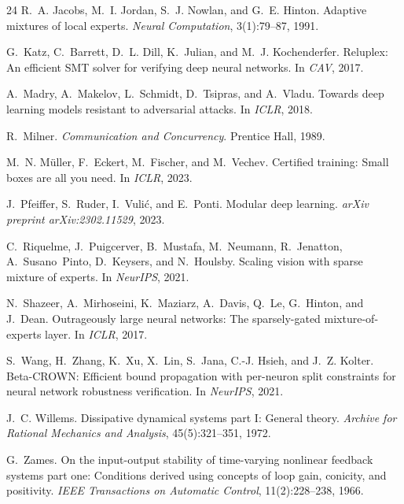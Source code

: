 \documentclass{article}
\theoremstyle{plain}
\theoremstyle{remark}
\begin{document}
\begin{thebibliography}{24}
R.~A. Jacobs, M.~I. Jordan, S.~J. Nowlan, and G.~E. Hinton.
\newblock Adaptive mixtures of local experts.
\newblock \emph{Neural Computation}, 3(1):79--87, 1991.

G.~Katz, C.~Barrett, D.~L. Dill, K.~Julian, and M.~J. Kochenderfer.
\newblock Reluplex: An efficient SMT solver for verifying deep neural networks.
\newblock In \emph{CAV}, 2017.

A.~Madry, A.~Makelov, L.~Schmidt, D.~Tsipras, and A.~Vladu.
\newblock Towards deep learning models resistant to adversarial attacks.
\newblock In \emph{ICLR}, 2018.

R.~Milner.
\newblock \emph{Communication and Concurrency}.
\newblock Prentice Hall, 1989.

M.~N. M{\"u}ller, F.~Eckert, M.~Fischer, and M.~Vechev.
\newblock Certified training: Small boxes are all you need.
\newblock In \emph{ICLR}, 2023.

J.~Pfeiffer, S.~Ruder, I.~Vuli{\'c}, and E.~Ponti.
\newblock Modular deep learning.
\newblock \emph{arXiv preprint arXiv:2302.11529}, 2023.

C.~Riquelme, J.~Puigcerver, B.~Mustafa, M.~Neumann, R.~Jenatton, A.~Susano~Pinto, D.~Keysers, and N.~Houlsby.
\newblock Scaling vision with sparse mixture of experts.
\newblock In \emph{NeurIPS}, 2021.

N.~Shazeer, A.~Mirhoseini, K.~Maziarz, A.~Davis, Q.~Le, G.~Hinton, and J.~Dean.
\newblock Outrageously large neural networks: The sparsely-gated mixture-of-experts layer.
\newblock In \emph{ICLR}, 2017.

S.~Wang, H.~Zhang, K.~Xu, X.~Lin, S.~Jana, C.-J. Hsieh, and J.~Z. Kolter.
\newblock Beta-CROWN: Efficient bound propagation with per-neuron split constraints for neural network robustness verification.
\newblock In \emph{NeurIPS}, 2021.

J.~C. Willems.
\newblock Dissipative dynamical systems part I: General theory.
\newblock \emph{Archive for Rational Mechanics and Analysis}, 45(5):321--351, 1972.

G.~Zames.
\newblock On the input-output stability of time-varying nonlinear feedback systems part one: Conditions derived using concepts of loop gain, conicity, and positivity.
\newblock \emph{IEEE Transactions on Automatic Control}, 11(2):228--238, 1966.


\end{thebibliography}
\end{document}
